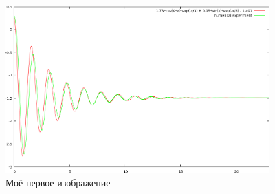\documentclass{article}
\begin{document}
\begin{figure}
  \begin{center}
    \includegraphics[width=4in,keepaspectratio]{figure1}
  \end{center}
  \caption{Моё первое изображение}
\end{figure}

%
%
%
%
%
%
\end{document}
